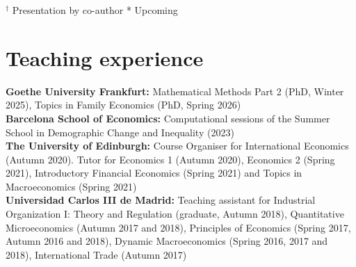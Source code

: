 \documentclass[margin]{res} %
\begin{document}
\begin{resume}
$^\dagger$ Presentation by co-author * Upcoming


\section{Teaching experience}
{\bf Goethe University Frankfurt:} Mathematical Methods Part 2 (PhD, Winter 2025), Topics in Family Economics (PhD, Spring 2026) \\
{\bf Barcelona School of Economics:} Computational sessions of the Summer School in Demographic Change and Inequality (2023) \\
{\bf The University of Edinburgh:} Course Organiser for International Economics (Autumn 2020). Tutor for Economics 1 (Autumn 2020), Economics 2 (Spring 2021), Introductory Financial Economics (Spring 2021) and Topics in Macroeconomics (Spring 2021) \\
{\bf Universidad Carlos III de Madrid:} Teaching assistant for Industrial Organization I: Theory and Regulation (graduate, Autumn 2018), Quantitative Microeconomics (Autumn 2017 and 2018), Principles of Economics (Spring 2017, Autumn 2016 and 2018), Dynamic Macroeconomics (Spring 2016, 2017 and 2018), International Trade (Autumn 2017)



\end{resume}
\end{document}
